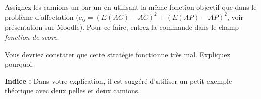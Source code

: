 \subsection{} 


Assignez les camions un par un en utilisant la même fonction objectif que dans le problème d'affectation ($c_{ij} = \left(E(AC)-AC\right)^2 + \left(E(AP)-AP\right)^2$, voir présentation sur Moodle). Pour ce faire, entrez la commande  dans le champ \textit{fonction de score}. 

\noindent Vous devriez constater que cette stratégie fonctionne très mal. Expliquez pourquoi.

\noindent\textbf{Indice : }Dans votre explication, il est suggéré d'utiliser un petit exemple théorique avec deux pelles et deux camions.


